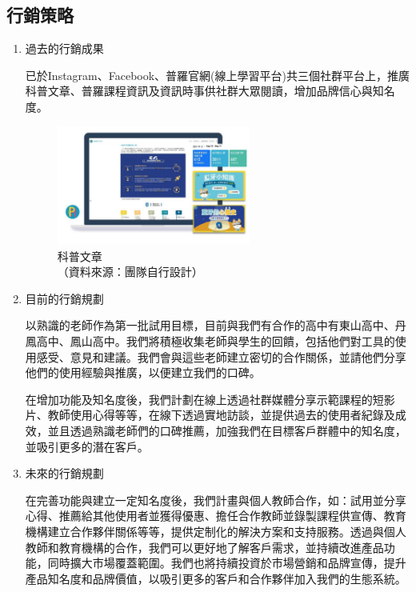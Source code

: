 \subsection{行銷策略}

\begin{enumerate}[label=(\arabic*)]
  \setlength{\parindent}{2em}
  \item 過去的行銷成果
    \par 已於Instagram、Facebook、普羅官網(線上學習平台)共三個社群平台上，推廣科普文章、普羅課程資訊及資訊時事供社群大眾閱讀，增加品牌信心與知名度。
    \begin{figure}[H]
      \centering
      \includegraphics[width=0.6\textwidth]{./Strategies/img/article.png}
      \caption[科普文章]{科普文章 \\（資料來源：團隊自行設計）}
  	\end{figure}
  \item 目前的行銷規劃
  	\par 以熟識的老師作為第一批試用目標，目前與我們有合作的高中有東山高中、丹鳳高中、鳳山高中。我們將積極收集老師與學生的回饋，包括他們對工具的使用感受、意見和建議。我們會與這些老師建立密切的合作關係，並請他們分享他們的使用經驗與推廣，以便建立我們的口碑。
  	\par 在增加功能及知名度後，我們計劃在線上透過社群媒體分享示範課程的短影片、教師使用心得等等，在線下透過實地訪談，並提供過去的使用者紀錄及成效，並且透過熟識老師們的口碑推薦，加強我們在目標客戶群體中的知名度，並吸引更多的潛在客戶。
  \item 未來的行銷規劃
  	\par 在完善功能與建立一定知名度後，我們計畫與個人教師合作，如：試用並分享心得、推薦給其他使用者並獲得優惠、擔任合作教師並錄製課程供宣傳、教育機構建立合作夥伴關係等等，提供定制化的解決方案和支持服務。透過與個人教師和教育機構的合作，我們可以更好地了解客戶需求，並持續改進產品功能，同時擴大市場覆蓋範圍。我們也將持續投資於市場營銷和品牌宣傳，提升產品知名度和品牌價值，以吸引更多的客戶和合作夥伴加入我們的生態系統。
\end{enumerate}
